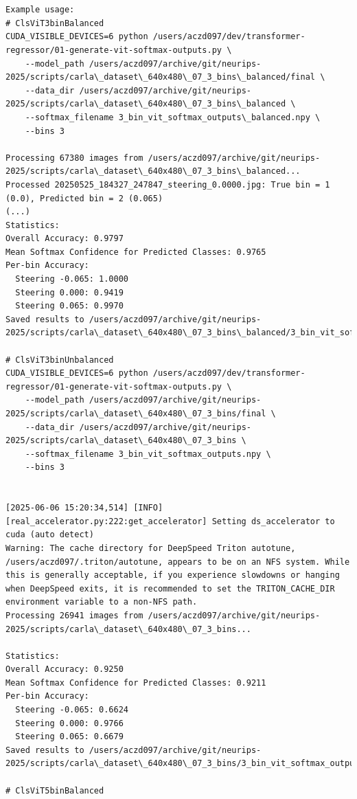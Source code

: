 \begin{verbatim}

    
Example usage:
# ClsViT3binBalanced
CUDA_VISIBLE_DEVICES=6 python /users/aczd097/dev/transformer-regressor/01-generate-vit-softmax-outputs.py \
    --model_path /users/aczd097/archive/git/neurips-2025/scripts/carla\_dataset\_640x480\_07_3_bins\_balanced/final \
    --data_dir /users/aczd097/archive/git/neurips-2025/scripts/carla\_dataset\_640x480\_07_3_bins\_balanced \
    --softmax_filename 3_bin_vit_softmax_outputs\_balanced.npy \
    --bins 3

Processing 67380 images from /users/aczd097/archive/git/neurips-2025/scripts/carla\_dataset\_640x480\_07_3_bins\_balanced...
Processed 20250525_184327_247847_steering_0.0000.jpg: True bin = 1 (0.0), Predicted bin = 2 (0.065)
(...)
Statistics:
Overall Accuracy: 0.9797
Mean Softmax Confidence for Predicted Classes: 0.9765
Per-bin Accuracy:
  Steering -0.065: 1.0000
  Steering 0.000: 0.9419
  Steering 0.065: 0.9970
Saved results to /users/aczd097/archive/git/neurips-2025/scripts/carla\_dataset\_640x480\_07_3_bins\_balanced/3_bin_vit_softmax_outputs\_balanced.npy

# ClsViT3binUnbalanced
CUDA_VISIBLE_DEVICES=6 python /users/aczd097/dev/transformer-regressor/01-generate-vit-softmax-outputs.py \
    --model_path /users/aczd097/archive/git/neurips-2025/scripts/carla\_dataset\_640x480\_07_3_bins/final \
    --data_dir /users/aczd097/archive/git/neurips-2025/scripts/carla\_dataset\_640x480\_07_3_bins \
    --softmax_filename 3_bin_vit_softmax_outputs.npy \
    --bins 3        


[2025-06-06 15:20:34,514] [INFO] [real_accelerator.py:222:get_accelerator] Setting ds_accelerator to cuda (auto detect)
Warning: The cache directory for DeepSpeed Triton autotune, /users/aczd097/.triton/autotune, appears to be on an NFS system. While this is generally acceptable, if you experience slowdowns or hanging when DeepSpeed exits, it is recommended to set the TRITON_CACHE_DIR environment variable to a non-NFS path.
Processing 26941 images from /users/aczd097/archive/git/neurips-2025/scripts/carla\_dataset\_640x480\_07_3_bins...

Statistics:
Overall Accuracy: 0.9250
Mean Softmax Confidence for Predicted Classes: 0.9211
Per-bin Accuracy:
  Steering -0.065: 0.6624
  Steering 0.000: 0.9766
  Steering 0.065: 0.6679
Saved results to /users/aczd097/archive/git/neurips-2025/scripts/carla\_dataset\_640x480\_07_3_bins/3_bin_vit_softmax_outputs.npy

# ClsViT5binBalanced


\end{verbatim}

